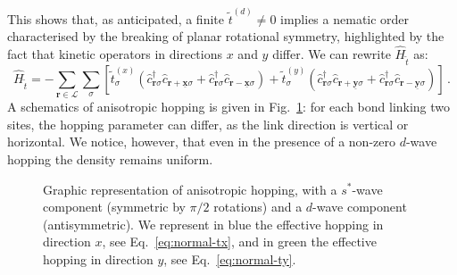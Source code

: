 This shows that, as anticipated, a finite $\tilde{t}^{(d)} \neq 0$ implies a nematic order characterised by the breaking of planar rotational symmetry, highlighted by the fact that kinetic operators in directions $x$ and $y$ differ. We can rewrite $\hat H_{\tilde{t}}$ as:
\[
	\hat H_{\tilde{t}} = - \sum_{\mathbf{r}\in\mathcal{L}} \sum_\sigma \left[
		\tilde{t}_\sigma^{(x)} \left(
			\hat c_{\mathbf{r}\sigma}^\dagger \hat c_{\mathbf{r}+\underline{\mathbf{x}}\sigma} + \hat c_{\mathbf{r}\sigma}^\dagger \hat c_{\mathbf{r}-\underline{\mathbf{x}}\sigma}
		\right) + \tilde{t}_\sigma^{(y)} \left(
			\hat c_{\mathbf{r}\sigma}^\dagger \hat c_{\mathbf{r}+\underline{\mathbf{y}}\sigma} + \hat c_{\mathbf{r}\sigma}^\dagger \hat c_{\mathbf{r}-\underline{\mathbf{y}}\sigma}
		\right)
	\right] \, .
\]
A schematics of anisotropic hopping is given in Fig.~\ref{fig:anisotropic-hopping}: for each bond linking two sites, the hopping parameter can differ, as the link direction is vertical or horizontal. We notice, however, that even in the presence of a non-zero $d$-wave hopping the density remains uniform.

\begin{figure}
	\centering
	
	\caption{Graphic representation of anisotropic hopping, with a $s^*$-wave component (symmetric by $\pi/2$ rotations) and a $d$-wave component (antisymmetric). We represent in blue the effective hopping in direction $x$, see Eq.~\eqref{eq:normal-tx}, and in green the effective hopping in direction $y$, see Eq.~\eqref{eq:normal-ty}.}
	\label{fig:anisotropic-hopping}
\end{figure}

